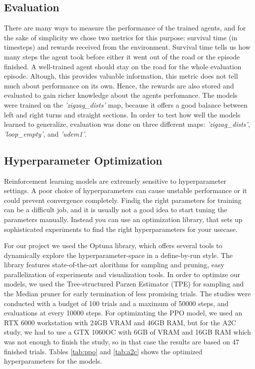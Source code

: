 \documentclass{article}
\begin{document}
\subsection{\normalsize{Evaluation}}
There are many ways to measure the performance of the trained agents, and for the sake of simplicity we chose two metrics for this purpose: survival time (in timesteps) and rewards received from the environment. Survival time tells us how many steps the agent took before either it went out of the road or the episode finished. A well-trained agent should stay on the road for the whole evaluation episode. 
Altough, this provides valuable information, this metric does not tell much about performance on its own. Hence, the rewards are also stored and evaluated to gain richer knowledge about the agents perfomance. The models were trained on the \textit{'zigzag\_dists'} map, because it offers a good balance between left and right turns and straight sections. In order to test how well the models learned to generalize, evaluation was done on three different maps: \textit{'zigzag\_dists'}, \textit{'loop\_empty'}, and \textit{'udem1'}.

\subsection{\normalsize{Hyperparameter Optimization}}
Reinforcement learning models are extremely sensitive to hyperparameter settings. A poor choice of hyperparameters can cause unstable performance or it could prevent convergence completely. Findig the right parameters for training can be a difficult job, and it is usually not a good idea to start tuning the parameters manually. Instead you can use an optimization library, that sets up sophisticated experiments to find the right hyperparameters for your usecase.

For our project we used the Optuna library, which offers several tools to dynamically explore the hyperparameter-space in a define-by-run style. The library features state-of-the-art alorithms for sampling and pruning, easy parallelization of experiments and visualization tools. In order to optimize our models, we used the Tree-structured Parzen Estimator (TPE) for sampling and the Median pruner for early termination of less promising trials. 
The studies were conducted with a budget of 100 trials and a maximum of 50000 steps, and evaluations at every 10000 steps. For optimizating the PPO model, we used an RTX 6000 workstation with 24GB VRAM and 46GB RAM, but for the A2C study, we had to use a GTX 1060OC with 6GB of VRAM and 16GB RAM which was not enough to finish the study, so in that case the results are based on 47 finished trials. Tables \ref{tab:ppo} and \ref{tab:a2c} shows the optimized hyperparameters for the models.
\end{document}
